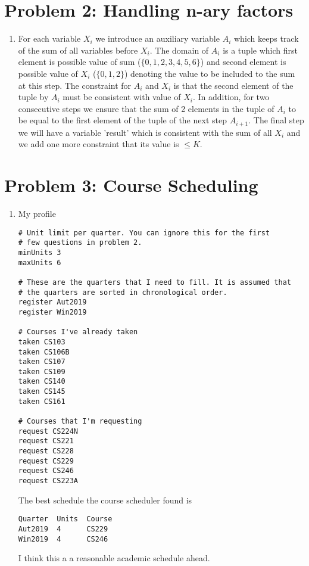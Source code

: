 \documentclass[12pt]{article}
\begin{document}
\section*{Problem 2: Handling n-ary factors}
\begin{enumerate}[label=(\alph*)]
	\item 
	For each variable $X_i$ we introduce an auxiliary variable $A_i$ which keeps track of the sum of all variables before $X_i$. The domain of $A_i$ is a tuple which first element is possible value of sum ($\{0, 1, 2, 3, 4, 5, 6\}$) and second element is possible value of $X_i$ ($\{0, 1, 2\}$) denoting the value to be included to the sum at this step. The constraint for $A_i$ and $X_i$ is that the second element of the tuple by $A_i$ must be consistent with value of $X_i$. In addition, for two consecutive steps we ensure that the sum of 2 elements in the tuple of $A_i$ to be equal to the first element of the tuple of the next step $A_{i+1}$. The final step we will have a variable 'result' which is consistent with the sum of all $X_i$ and we add one more constraint that its value is $\leq K$.
\end{enumerate}

\section*{Problem 3: Course Scheduling}
\begin{enumerate}[label=(\alph*)]
	\addtocounter{enumi}{2}
	\item 
	My profile
	\begin{lstlisting}
# Unit limit per quarter. You can ignore this for the first
# few questions in problem 2.
minUnits 3
maxUnits 6

# These are the quarters that I need to fill. It is assumed that
# the quarters are sorted in chronological order.
register Aut2019
register Win2019

# Courses I've already taken
taken CS103
taken CS106B
taken CS107
taken CS109
taken CS140
taken CS145
taken CS161

# Courses that I'm requesting
request CS224N
request CS221
request CS228
request CS229
request CS246
request CS223A
	\end{lstlisting}
	The best schedule the course scheduler found is
	\begin{lstlisting}
Quarter  Units  Course
Aut2019  4      CS229
Win2019  4      CS246	
	\end{lstlisting}
	I think this a a reasonable academic schedule ahead.
	
\end{enumerate}
\end{document}
